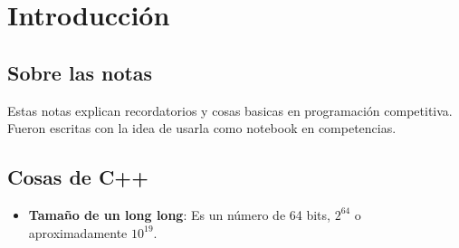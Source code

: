 \chapter{Introducción}

\section{Sobre las notas}
Estas notas explican recordatorios y cosas basicas en programación competitiva. 
Fueron escritas con la idea de usarla como notebook en competencias. 

\section{Cosas de C++}
\begin{itemize}
	\item \textbf{Tamaño de un long long}: Es un número de 64 bits, \( 2^{64} \) o aproximadamente \( 10^{19} \).
\end{itemize}
